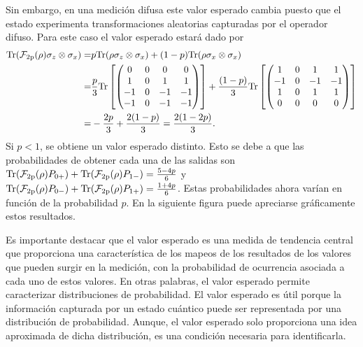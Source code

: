 Sin embargo, en una medición difusa este valor esperado cambia puesto que el estado experimenta transformaciones aleatorias capturadas por el operador difuso. Para este caso el valor esperado estará dado por \[\begin{split}{\rm Tr}(\mathcal{F}_{2\text{p}}(\rho)\sigma_z\otimes \sigma_x)=&p{\rm Tr}(\rho\sigma_z\otimes \sigma_x )+(1-p){\rm Tr}(\rho\sigma_x\otimes \sigma_x )\\
    =& \frac{p}{3}{\rm Tr}\left[ \begin{pmatrix}
        0&0&0&0\\
        1&0&1&1\\
        -1&0&-1&-1\\
        -1&0&-1&-1\\
    \end{pmatrix}\right]+ \frac{(1-p)}{3}{\rm Tr}\left[ \begin{pmatrix}
        1&0&1&1\\
        -1&0&-1&-1\\
        1&0&1&1\\
        0&0&0&0\\
    \end{pmatrix}\right]\\
    =&-\frac{2p}{3}+\frac{2(1-p)}{3}=\frac{2(1-2p)}{3}.
\end{split}\]Si $p<1$, se obtiene un valor esperado distinto. Esto se debe a que las probabilidades de obtener cada una de las salidas son ${\rm Tr}(\mathcal{F}_{2\text{p}}(\rho)P_{0+})+{\rm Tr}(\mathcal{F}_{2\text{p}}(\rho)P_{1-})=\frac{5-4p}{6}$ y ${\rm Tr}(\mathcal{F}_{2\text{p}}(\rho)P_{0-})+{\rm Tr}(\mathcal{F}_{2\text{p}}(\rho)P_{1+})=\frac{1+4p}{6}$. Estas probabilidades ahora varían en función de la probabilidad $p$. En la siguiente figura puede apreciarse gráficamente estos resultados.










Es importante destacar que el valor esperado es una medida de tendencia central que proporciona una característica de los mapeos de los resultados de los valores que pueden surgir en la medición, con la probabilidad de ocurrencia asociada a cada uno de estos valores. En otras palabras, el valor esperado permite caracterizar distribuciones de probabilidad. El valor esperado es útil porque la información capturada por un estado cuántico puede ser representada por una distribución de probabilidad. Aunque, el valor esperado solo proporciona una idea aproximada de dicha distribución, es una condición necesaria para identificarla. 

